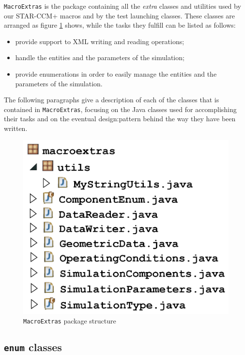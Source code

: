 \lstinline[language=Java]!MacroExtras! is the package containing all the \emph{extra} classes and utilities used by our STAR-CCM+ macros and by the test launching classes. These classes are arranged as figure \ref{fig:macroextraspackage} shows, while the tasks they fulfill can be listed as follows:
%
\begin{itemize}
\item provide support to XML writing and reading operations;
\item handle the entities and the parameters of the simulation;
\item provide enumerations in order to easily manage the entities and the parameters of the simulation.
\end{itemize}
%
The following paragraphs give a description of each of the classes that is contained in \lstinline[language=Java]!MacroExtras!, focusing on the Java classes used for accomplishing their tasks and on the eventual \gls{design:pattern} behind the way they have been written. 
%
\begin{figure}[H]
\centering
\includegraphics[scale=0.30]{Immagini/Capitolo4/macroextraspackage}
\caption{\lstinline[language=Java]!MacroExtras! package structure}
\label{fig:macroextraspackage}
\end{figure}
%  

\subsection{\texttt{enum} classes}
\label{sec4.3.1}


